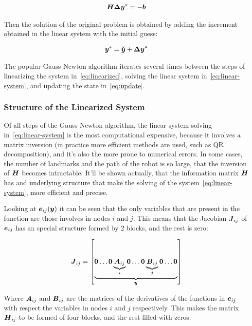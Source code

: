 \begin{equation}
\boldsymbol{H \Delta y}^* = -\boldsymbol{b}
\label{eq:linear-system}
\end{equation}

Then the solution of the original problem is obtained by adding the increment obtained in the linear system with the initial guess:

\begin{equation}
\boldsymbol{y}^* = \breve{\boldsymbol{y}}+ \boldsymbol{\Delta y}^*
\label{eq:update}
\end{equation}

The popular Gauss-Newton algorithm iterates several times between the steps of linearizing the system in~\eqref{eq:linearized}, solving the linear system in~\eqref{eq:linear-system}, and updating the state in~\eqref{eq:update}.  

\subsubsection{Structure of the Linearized System}

Of all steps of the Gauss-Newton algorithm, the linear system solving in~\eqref{eq:linear-system} is the most computational expensive, because it involves a matrix inversion (in practice more efficient methods are used, such as QR decomposition), and it's also the more prone to numerical errors. In some cases, the number of landmarks and the path of the robot is so large, that the inversion of $\boldsymbol{H}$ becomes intractable. It'll be shown actually, that the information matrix $\boldsymbol{H}$ has and underlying structure that make the solving of the system~\eqref{eq:linear-system}, more efficient and precise.


Looking at $\boldsymbol{e}_{ij}(\boldsymbol{y})$ it can be seen that the only variables that are present in the function are those involves in nodes $i$ and $j$. This means that the Jacobian $\boldsymbol{J}_{ij}$ of $\boldsymbol{e}_{ij}$ has an special structure formed by 2 blocks, and the rest is zero:

\begin{equation}
\boldsymbol{J}_{ij} = \left[ \underbrace{\boldsymbol{0} \dots \boldsymbol{0} 
    \underbrace{\boldsymbol{A}_{ij}}_{i} \boldsymbol{0} \dots \boldsymbol{0} 
    \underbrace{\boldsymbol{B}_{ij}}_{j}
    \boldsymbol{0} \dots \boldsymbol{0}}_{\boldsymbol{y}} \right] 
\end{equation}

Where $\boldsymbol{A}_{ij}$ and $\boldsymbol{B}_{ij}$ are the matrices of the derivatives of the functions in $\boldsymbol{e}_{ij}$ with respect the variables in nodes $i$ and $j$ respectively. This makes the matrix $\boldsymbol{H}_{ij}$ to be formed of four blocks, and the rest filled with zeros:

